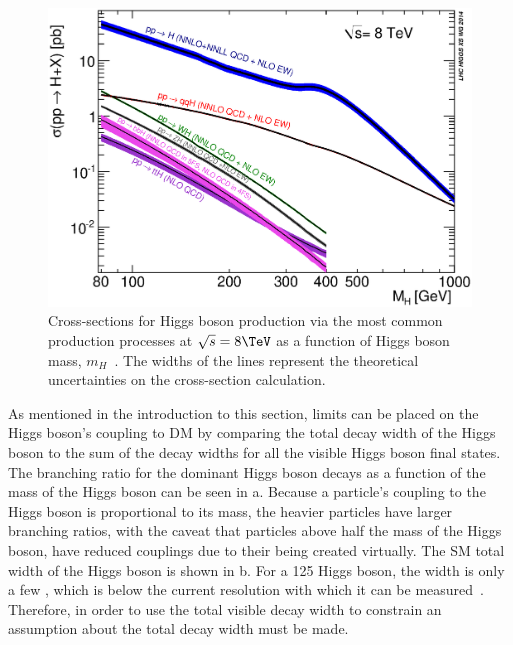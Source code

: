 \begin{figure}
  \includegraphics[width=\largefigwidth]{plots/theory/XS_8TeV.eps}
  \caption{Cross-sections for Higgs boson production via the most common production processes at $\sqrt{s}=8 \TeV$ as a function of Higgs boson mass, $m_{H}$~\cite{Heinemeyer:1559921}. The widths of the lines represent the theoretical uncertainties on the cross-section calculation.}
  \label{fig:smprod}
\end{figure}

As mentioned in the introduction to this section, limits can be placed on the Higgs boson's coupling to \ac{DM} by comparing the total decay width of the Higgs boson to the sum of the decay widths for all the visible Higgs boson final states. The branching ratio for the dominant Higgs boson decays as a function of the mass of the Higgs boson can be seen in a. Because a particle's coupling to the Higgs boson is proportional to its mass, the heavier particles have larger branching ratios, with the caveat that particles above half the mass of the Higgs boson, have reduced couplings due to their being created virtually. The \ac{SM} total width of the Higgs boson is shown in b. For a 125 \GeV Higgs boson, the width is only a few \MeV, which is below the current resolution with which it can be measured~\cite{PhysRevLett.114.191803}.
Therefore, in order to use the total visible decay width to constrain \BRinv an assumption about the total decay width must be made. 

